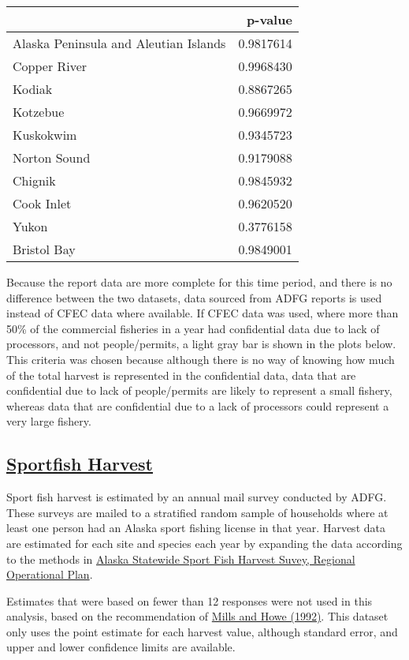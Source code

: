\documentclass[]{article}
\begin{document}
\begin{longtable}[]{@{}lr@{}}
\toprule
& p-value\tabularnewline
\midrule
\endhead
Alaska Peninsula and Aleutian Islands & 0.9817614\tabularnewline
Copper River & 0.9968430\tabularnewline
Kodiak & 0.8867265\tabularnewline
Kotzebue & 0.9669972\tabularnewline
Kuskokwim & 0.9345723\tabularnewline
Norton Sound & 0.9179088\tabularnewline
Chignik & 0.9845932\tabularnewline
Cook Inlet & 0.9620520\tabularnewline
Yukon & 0.3776158\tabularnewline
Bristol Bay & 0.9849001\tabularnewline
\bottomrule
\end{longtable}

Because the report data are more complete for this time period, and
there is no difference between the two datasets, data sourced from ADFG
reports is used instead of CFEC data where available. If CFEC data was
used, where more than 50\% of the commercial fisheries in a year had
confidential data due to lack of processors, and not people/permits, a
light gray bar is shown in the plots below. This criteria was chosen
because although there is no way of knowing how much of the total
harvest is represented in the confidential data, data that are
confidential due to lack of people/permits are likely to represent a
small fishery, whereas data that are confidential due to a lack of
processors could represent a very large fishery.

\hypertarget{sportfish-harvest}{%
\subsection{\texorpdfstring{\href{https://knb.ecoinformatics.org/\#view/urn:uuid:6a6a530f-3660-424f-adab-c771d1c89a5d}{Sportfish
Harvest}}{Sportfish Harvest}}\label{sportfish-harvest}}

Sport fish harvest is estimated by an annual mail survey conducted by
ADFG. These surveys are mailed to a stratified random sample of
households where at least one person had an Alaska sport fishing license
in that year. Harvest data are estimated for each site and species each
year by expanding the data according to the methods in
\href{https://knb.ecoinformatics.org/knb/d1/mn/v2/object/urn\%3Auuid\%3Ad64e5f8b-c91c-487a-8ce7-0cd271194f34}{Alaska
Statewide Sport Fish Harvest Suvey, Regional Operational Plan}.

Estimates that were based on fewer than 12 responses were not used in
this analysis, based on the recommendation of
\href{https://knb.ecoinformatics.org/knb/d1/mn/v2/object/urn\%3Auuid\%3Abb01b2c8-5e6c-4645-903d-39dbdd8d4d56}{Mills
and Howe (1992)}. This dataset only uses the point estimate for each
harvest value, although standard error, and upper and lower confidence
limits are available.
\end{document}
